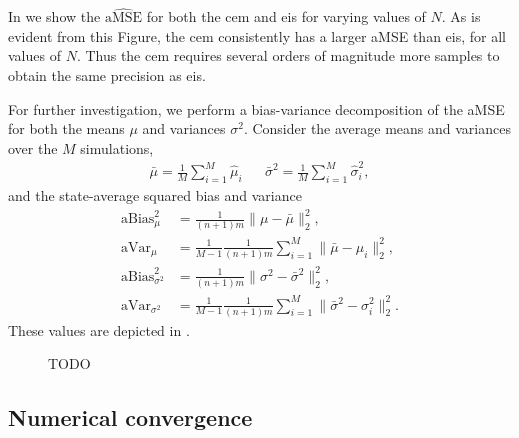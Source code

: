 
In  we show the $\widehat{\text{aMSE}}$ for both the \gls{cem} and \gls{eis} for varying values of $N$. As is evident from this Figure, the \gls{cem} consistently has a larger aMSE than \gls{eis}, for all values of $N$. Thus the \gls{cem} requires several orders of magnitude more samples to obtain the same precision as \gls{eis}.

For further investigation, we perform a bias-variance decomposition of the aMSE for both the means $\mu$ and variances $\sigma^{2}$. Consider the average means and variances over the $M$ simulations,
\begin{align*}
    \bar \mu = \frac{1}{M} \sum_{i=1}^{M} \hat\mu_{i} && \bar \sigma^{2} = \frac{1}{M} \sum_{i=1}^{M} \hat\sigma^{2}_{i},
\end{align*}
and the state-average squared bias and variance
\begin{align*}
    \text{aBias}^{2}_{\mu} &= \frac{1}{(n+1)m} \lVert \mu - \bar\mu \rVert^{2}_{2}, \\
    \text{aVar}_{\mu} &= \frac{1}{M - 1}\frac{1}{(n+1)m} \sum_{i=1}^M \lVert \bar\mu - \mu_{i} \rVert^{2}_{2},\\
    \text{aBias}^{2}_{\sigma^{2}} &= \frac{1}{(n+1)m} \lVert \sigma^{2} - \bar\sigma^{2} \rVert^{2}_{2}, \\
    \text{aVar}_{\sigma^{2}} &= \frac{1}{M - 1}\frac{1}{(n+1)m} \sum_{i=1}^M \lVert \bar\sigma^{2} - \sigma^{2}_{i} \rVert^{2}_{2}.
\end{align*}
These values are depicted in . 
\begin{figure}
    \resizebox{\textwidth}{!}{%
        
    }
    \caption{{\color{red} TODO}}
    \label{fig:mse_bias_var_decomposition}
\end{figure}



\subsection{Numerical convergence}
\label{subsec:numerical-convergence}

